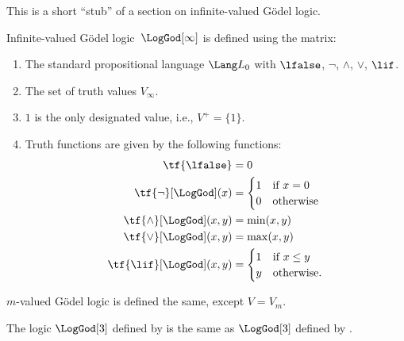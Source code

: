 \documentclass[../../../include/open-logic-section]{subfiles}
\begin{document}

\begin{editorial}
  This is a short ``stub'' of a section on infinite-valued G\"odel logic.
\end{editorial}

\begin{defn} Infinite-valued G\"odel
logic~$\LogGod[\infty]$ is defined using the matrix:
\begin{enumerate}
  \item The standard propositional language $\Lang L_0$ with
  $\lfalse$, $\lnot$, $\land$, $\lor$, $\lif$.
  \item The set of truth values $V_\infty$.
  \item $1$ is the only designated value, i.e., $V^+ = \{1\}$.
  \item Truth functions are given by the following functions:
  \begin{align*}
    \tf{\lfalse} & = 0\\
    \tf{\lnot}[\LogGod](x) & = \begin{cases}
      $1$ & \text{if } x =0\\
      $0$ & \text{otherwise}
    \end{cases}\\
    \tf{\land}[\LogGod](x,y) & = \min(x,y)\\
    \tf{\lor}[\LogGod](x,y) & = \max(x,y)\\
    \tf{\lif}[\LogGod](x,y) & = \begin{cases}
      1 & \text{if } x \le y\\
      y & \text{otherwise.}
    \end{cases}
    \end{align*}
\end{enumerate}
$m$-valued G\"odel logic is defined the same, except $V = V_m$.
\end{defn}

\begin{prop}
  The logic $\LogGod[3]$ defined by 
  is the same as $\LogGod[3]$ defined by .
\end{prop}
\end{document}

